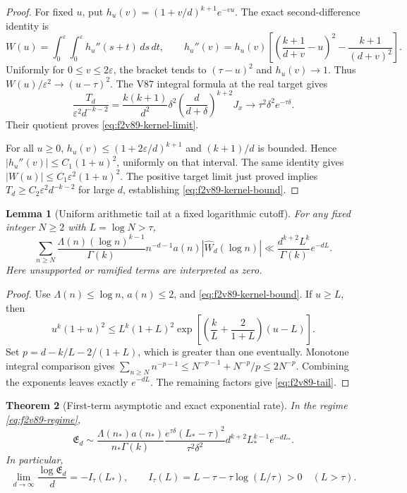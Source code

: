 \documentclass[11pt]{article}
\newtheorem{theorem}{Theorem}[section]
\newtheorem{lemma}[theorem]{Lemma}
\theoremstyle{definition}
\theoremstyle{remark}
\begin{document}
\begin{proof}
For fixed \(u\), put
\(h_u(v)=(1+v/d)^{k+1}e^{-vu}\).  The exact second-difference
identity is
\[
 W(u)=\int_0^\varepsilon\!\int_0^\varepsilon h_u''(s+t)\,ds\,dt,
 \qquad
 h_u''(v)=h_u(v)\left[
       \left(\frac{k+1}{d+v}-u\right)^2
       -\frac{k+1}{(d+v)^2}\right].
\]
Uniformly for \(0\le v\le2\varepsilon\), the bracket tends to
\((\tau-u)^2\) and \(h_u(v)\to1\).  Thus
\(W(u)/\varepsilon^2\to(u-\tau)^2\).  The V87 integral formula at
the real target gives
\[
 \frac{T_d}{\varepsilon^2d^{-k-2}}
 =\frac{k(k+1)}{d^2}\delta^2
        \left(\frac{d}{d+\delta}\right)^{k+2}J_x
 \longrightarrow\tau^2\delta^2e^{-\tau\delta}.
\]
Their quotient proves \eqref{eq:f2v89-kernel-limit}.

For all \(u\ge0\), \(h_u(v)\le(1+2\varepsilon/d)^{k+1}\)
and \((k+1)/d\) is bounded.  Hence
\(|h_u''(v)|\le C_1(1+u)^2\), uniformly on that interval.  The same
identity gives \(|W(u)|\le C_1\varepsilon^2(1+u)^2\).
The positive target limit just proved implies
\(T_d\ge C_2\varepsilon^2d^{-k-2}\) for large \(d\), establishing
\eqref{eq:f2v89-kernel-bound}.
\end{proof}

\begin{lemma}[Uniform arithmetic tail at a fixed logarithmic cutoff]
\label{lem:f2v89-arithmetic-tail}
For any fixed integer \(N\ge2\) with \(L=\log N>\tau\),
\begin{equation}
 \sum_{n\ge N}\frac{\Lambda(n)(\log n)^{k-1}}{\Gamma(k)}
       n^{-d-1}a(n)|\widehat W_d(\log n)|
 \ll \frac{d^{k+2}L^k}{\Gamma(k)}e^{-dL}.
 \label{eq:f2v89-tail}
\end{equation}
Here unsupported or ramified terms are interpreted as zero.
\end{lemma}

\begin{proof}
Use \(\Lambda(n)\le\log n\), \(a(n)\le2\), and
\eqref{eq:f2v89-kernel-bound}.  If \(u\ge L\), then
\[
 u^k(1+u)^2\le
 L^k(1+L)^2\exp\left[
 \left(\frac{k}{L}+\frac2{1+L}\right)(u-L)\right].
\]
Set \(p=d-k/L-2/(1+L)\), which is greater than one eventually.
Monotone integral comparison gives
\(\sum_{n\ge N}n^{-p-1}\le N^{-p-1}+N^{-p}/p\le2N^{-p}\).
Combining the exponents leaves exactly \(e^{-dL}\).  The remaining
factors give \eqref{eq:f2v89-tail}.
\end{proof}

\begin{theorem}[First-term asymptotic and exact exponential rate]
\label{thm:f2v89-first-term}
In the regime \eqref{eq:f2v89-regime},
\begin{equation}
 \mathfrak E_d\sim
 \frac{\Lambda(n_*)a(n_*)}{n_*\Gamma(k)}
 \frac{e^{\tau\delta}(L_*-\tau)^2}{\tau^2\delta^2}
 d^{k+2}L_*^{k-1}e^{-dL_*}.
 \label{eq:f2v89-asymptotic}
\end{equation}
In particular,
\begin{equation}
 \lim_{d\to\infty}\frac{\log\mathfrak E_d}{d}
 =-I_\tau(L_*),\qquad
 I_\tau(L)=L-\tau-\tau\log(L/\tau)>0\quad(L>\tau).
 \label{eq:f2v89-rate}
\end{equation}
\end{theorem}
\end{document}
